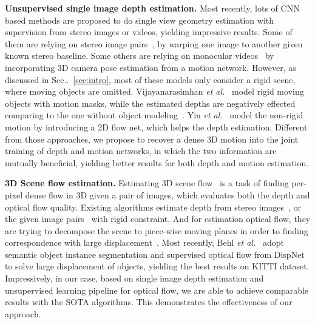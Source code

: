 \documentclass[runningheads]{llncs}
\makeatletter
\newcommand{\secref}[1]{Sec\onedot~\ref{#1}}
\DeclareRobustCommand\onedot{\futurelet\@let@token\@onedot}
\def\onedot{\ifx\@let@token.\else.\null\fi\xspace}
\def\etal{\emph{et al.}}
\makeatother
\begin{document}
\noindent\textbf{Unsupervised single image depth estimation.}
Most recently, lots of CNN based methods are proposed to do single view geometry estimation with supervision from stereo images or videos, yielding impressive results. 
Some of them are relying on stereo image pairs~\cite{xie2016deep3d,GargBR16,godard2016unsupervised}, by warping one image to another given known stereo baseline. 
Some others are relying on monocular videos~\cite{zhou2017unsupervised,wang2017learning,li2017undeepvo,yang2018aaai,mahjourian2018unsupervised,yin2018geonet,yang2018cvpr} by incorporating 3D camera pose estimation from a motion network. However, as discussed in \secref{sec:intro}, most of these models only consider a rigid scene, where moving objects are omitted. 
Vijayanarasimhan \etal~\cite{Vijayanarasimhan17} model rigid moving objects with  motion masks, while the estimated depths are negatively effected comparing to the one without object modeling~\cite{zhou2017unsupervised}. Yin \etal~\cite{yin2018geonet} model the non-rigid motion by introducing a 2D flow net, which helps the depth estimation. Different from those approaches, we propose to recover a dense 3D motion into the joint training of depth and motion networks, in which the two information are mutually beneficial, yielding better results for both depth and motion estimation. 






\noindent\textbf{3D Scene flow estimation.}
Estimating 3D scene flow~\cite{vedula2005three} is a task of finding per-pixel dense flow in 3D given a pair of images, which evaluates both the depth and optical flow quality. Existing algorithms estimate depth from stereo images~\cite{menze2015cvpr,behl2017bounding}, or the given image pairs~\cite{kumar2017monocular} with rigid constraint. And for estimation optical flow, they are trying to decompose the scene to piece-wise moving planes in order to finding correspondence with large displacement~\cite{vogel2013piecewise,lv2016continuous}.
Most recently, Behl \etal~\cite{behl2017bounding} adopt semantic object instance segmentation and supervised optical flow from DispNet~\cite{mayer2016large} to solve large displacement of objects, yielding the best results on KITTI dataset. 
Impressively, in our case, based on single image depth estimation and unsupervised learning pipeline for optical flow, we are able to achieve comparable results with the SOTA algorithms. This demonstrates the effectiveness of our approach.
\end{document}
